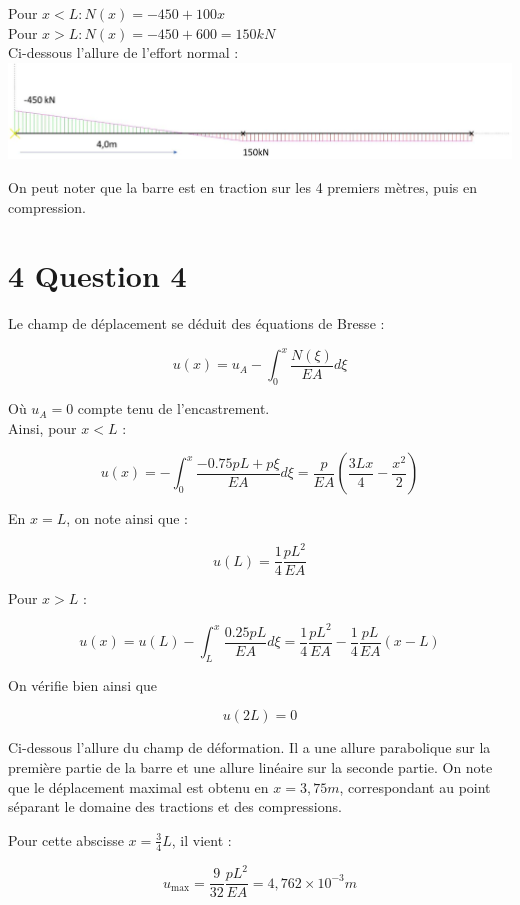 \documentclass[11pt,a4paper]{report}
\begin{document}
{Pour $x<L: N(x)=-450+100 x$\\
Pour $x>L: N(x)=-450+600=150 k N$\\
Ci-dessous l'allure de l'effort normal :\\
\includegraphics[max width=\textwidth, center]{2025_10_03_26e11264345fd9bad5cag-4}

On peut noter que la barre est en traction sur les 4 premiers mètres, puis en compression.

\section*{4 Question 4}
Le champ de déplacement se déduit des équations de Bresse :

$$
u(x)=u_{A}-\int_{0}^{x} \frac{N(\xi)}{E A} d \xi
$$

Où $u_{A}=0$ compte tenu de l'encastrement.\\
Ainsi, pour $x<L$ :

$$
u(x)=-\int_{0}^{x} \frac{-0.75 p L+p \xi}{E A} d \xi=\frac{p}{E A}\left(\frac{3 L x}{4}-\frac{x^{2}}{2}\right)
$$

En $x=L$, on note ainsi que :

$$
u(L)=\frac{1}{4} \frac{p L^{2}}{E A}
$$

Pour $x>L$ :

$$
u(x)=u(L)-\int_{L}^{x} \frac{0.25 p L}{E A} d \xi=\frac{1}{4} \frac{p L^{2}}{E A}-\frac{1}{4} \frac{p L}{E A}(x-L)
$$

On vérifie bien ainsi que

$$
u(2 L)=0
$$

Ci-dessous l'allure du champ de déformation. Il a une allure parabolique sur la première partie de la barre et une allure linéaire sur la seconde partie. On note que le déplacement maximal est obtenu en $x=3,75 m$, correspondant au point séparant le domaine des tractions et des compressions.

Pour cette abscisse $x=\frac{3}{4} L$, il vient :

$$
u_{\max }=\frac{9}{32} \frac{p L^{2}}{E A}=4,762 \times 10^{-3} m
$$

}
\end{document}
